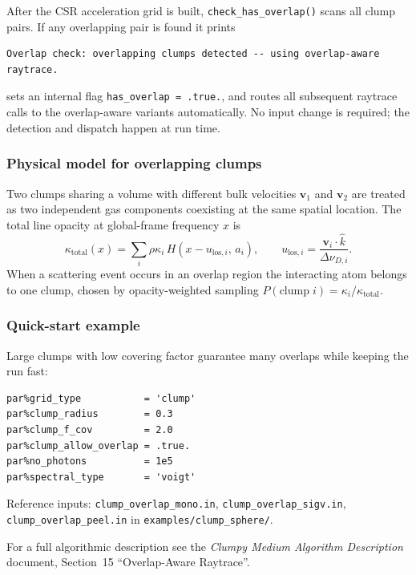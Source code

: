 \documentclass[english,a4paper]{my_memo}
\begin{document}
After the CSR acceleration grid is built, \texttt{check\_has\_overlap()} scans all clump
pairs.  If any overlapping pair is found it prints
\begin{lstlisting}
Overlap check: overlapping clumps detected -- using overlap-aware raytrace.
\end{lstlisting}
sets an internal flag \texttt{has\_overlap = .true.}, and routes all subsequent raytrace
calls to the overlap-aware variants automatically.  No input change is required; the
detection and dispatch happen at run time.

\subsubsection*{Physical model for overlapping clumps}

Two clumps sharing a volume with different bulk velocities $\boldsymbol{v}_1$ and
$\boldsymbol{v}_2$ are treated as two independent gas components coexisting at the same
spatial location.  The total line opacity at global-frame frequency $x$ is
\begin{equation}
  \kappa_\text{total}(x)
  = \sum_i \rho\kappa_i\,H(x - u_{\text{los},i},\,a_i),
  \qquad u_{\text{los},i} = \frac{\boldsymbol{v}_i\cdot\hat{k}}{\Delta\nu_{D,i}}.
\end{equation}
When a scattering event occurs in an overlap region the interacting atom belongs to
one clump, chosen by opacity-weighted sampling
$P(\text{clump}\;i) = \kappa_i / \kappa_\text{total}$.

\subsubsection*{Quick-start example}

Large clumps with low covering factor guarantee many overlaps while keeping the run
fast:
\begin{lstlisting}
par%grid_type           = 'clump'
par%clump_radius        = 0.3
par%clump_f_cov         = 2.0
par%clump_allow_overlap = .true.
par%no_photons          = 1e5
par%spectral_type       = 'voigt'
\end{lstlisting}
\begin{sloppypar}
Reference inputs: \texttt{clump\_overlap\_mono.in},
\texttt{clump\_overlap\_sigv.in}, \texttt{clump\_overlap\_peel.in} in
\texttt{examples/clump\_sphere/}.
\end{sloppypar}

For a full algorithmic description see the \emph{Clumpy Medium Algorithm Description}
document, Section~15 ``Overlap-Aware Raytrace''.
\end{document}
